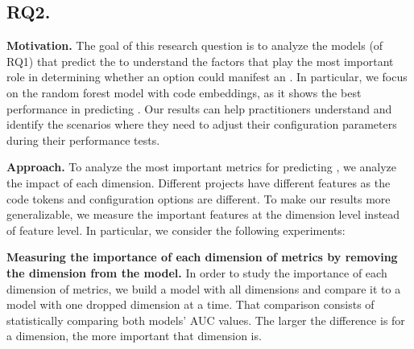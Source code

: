 
\subsection*{\textbf{RQ2. \RQIII}}
\label{sec:rq3}

\noindent \textbf{Motivation.}
The goal of this research question is to analyze the models (of RQ1) that predict the \inconsistent to understand the factors that play the most important role in determining whether an option could manifest an \inconsistent. %
In particular, we focus on the random forest model with code embeddings, as it shows the best performance in predicting \inconsistent. 
Our results can help practitioners understand and identify the scenarios where they need to adjust their configuration parameters during their performance tests.

\noindent \textbf{Approach.}
To analyze the most important metrics for predicting \inconsistent, we analyze the impact of each dimension. 
Different projects have different features as the code tokens and configuration options are different. To make our results more generalizable, we measure the important features at the dimension level instead of feature level. In particular, we consider the following experiments:

\noindent\textbf{Measuring the importance of each dimension of metrics by removing the dimension from the model.} 
In order to study the importance of each dimension of metrics, we build a model with all dimensions and compare it to a model with one dropped dimension at a time. That comparison consists of statistically comparing both models' AUC values. The larger the difference is for a dimension, the more important that dimension is. %

